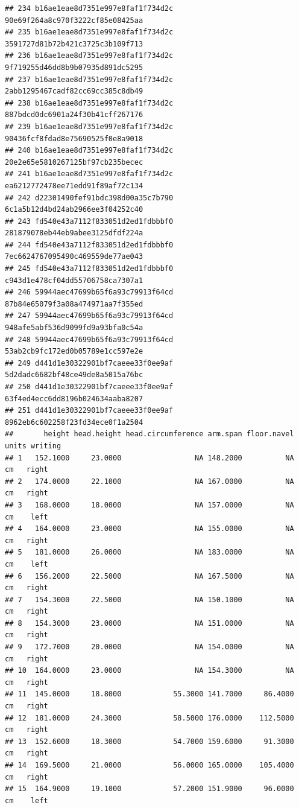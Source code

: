 \documentclass[]{article}
\begin{document}
\begin{verbatim}
## 234 b16ae1eae8d7351e997e8faf1f734d2c   90e69f264a8c970f3222cf85e08425aa
## 235 b16ae1eae8d7351e997e8faf1f734d2c   3591727d81b72b421c3725c3b109f713
## 236 b16ae1eae8d7351e997e8faf1f734d2c   9f719255d46dd8b9b07935d891dc5295
## 237 b16ae1eae8d7351e997e8faf1f734d2c   2abb1295467cadf82cc69cc385c8db49
## 238 b16ae1eae8d7351e997e8faf1f734d2c   887bdcd0dc6901a24f30b41cff267176
## 239 b16ae1eae8d7351e997e8faf1f734d2c   90436fcf8fdad8e75690525f0e8a9018
## 240 b16ae1eae8d7351e997e8faf1f734d2c   20e2e65e5810267125bf97cb235becec
## 241 b16ae1eae8d7351e997e8faf1f734d2c   ea6212772478ee71edd91f89af72c134
## 242 d22301490fef91bdc398d00a35c7b790   6c1a5b12d4bd24ab2966ee3f04252c40
## 243 fd540e43a7112f833051d2ed1fdbbbf0   281879078eb44eb9abee3125dfdf224a
## 244 fd540e43a7112f833051d2ed1fdbbbf0   7ec6624767095490c469559de77ae043
## 245 fd540e43a7112f833051d2ed1fdbbbf0   c943d1e478cf04dd55706758ca7307a1
## 246 59944aec47699b65f6a93c79913f64cd   87b84e65079f3a08a474971aa7f355ed
## 247 59944aec47699b65f6a93c79913f64cd   948afe5abf536d9099fd9a93bfa0c54a
## 248 59944aec47699b65f6a93c79913f64cd   53ab2cb9fc172ed0b05789e1cc597e2e
## 249 d441d1e30322901bf7caeee33f0ee9af   5d2dadc6682bf48ce49de8a5015a76bc
## 250 d441d1e30322901bf7caeee33f0ee9af   63f4ed4ecc6dd8196b024634aaba8207
## 251 d441d1e30322901bf7caeee33f0ee9af   8962eb6c602258f23fd34ece0f1a2504
##       height head.height head.circumference arm.span floor.navel  units writing
## 1   152.1000     23.0000                 NA 148.2000          NA     cm   right
## 2   174.0000     22.1000                 NA 167.0000          NA     cm   right
## 3   168.0000     18.0000                 NA 157.0000          NA     cm    left
## 4   164.0000     23.0000                 NA 155.0000          NA     cm   right
## 5   181.0000     26.0000                 NA 183.0000          NA     cm    left
## 6   156.2000     22.5000                 NA 167.5000          NA     cm   right
## 7   154.3000     22.5000                 NA 150.1000          NA     cm   right
## 8   154.3000     23.0000                 NA 151.0000          NA     cm   right
## 9   172.7000     20.0000                 NA 154.0000          NA     cm   right
## 10  164.0000     23.0000                 NA 154.3000          NA     cm   right
## 11  145.0000     18.8000            55.3000 141.7000     86.4000     cm   right
## 12  181.0000     24.3000            58.5000 176.0000    112.5000     cm   right
## 13  152.6000     18.3000            54.7000 159.6000     91.3000     cm   right
## 14  169.5000     21.0000            56.0000 165.0000    105.4000     cm   right
## 15  164.9000     19.1000            57.2000 151.9000     96.0000     cm    left

\end{verbatim}
\end{document}
